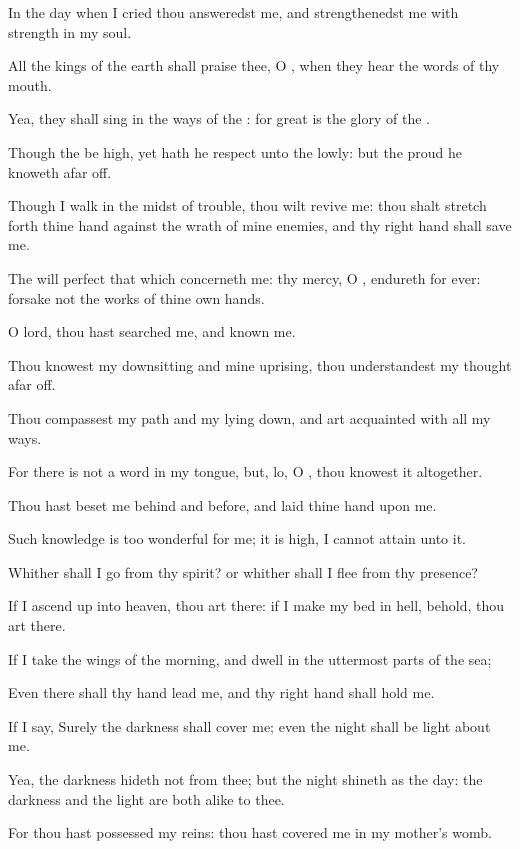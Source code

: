 \Verse In the day when I cried thou answeredst me, and strengthenedst me with strength in my soul.

\Verse All the kings of the earth shall praise thee, O \LORD, when they hear the words of thy mouth.

\Verse Yea, they shall sing in the ways of the \LORD: for great is the glory of the \LORD.

\Verse Though the \LORD be high, yet hath he respect unto the lowly: but the proud he knoweth afar off.

\Verse Though I walk in the midst of trouble, thou wilt revive me: thou shalt stretch forth thine hand against the wrath of mine enemies, and thy right hand shall save me.

\Verse The \LORD will perfect that which concerneth me: thy mercy, O \LORD, endureth for ever: forsake not the works of thine own hands.




\Chapter
\Verse O lord, thou hast searched me, and known me.

\Verse Thou knowest my downsitting and mine uprising, thou understandest my thought afar off.

\Verse Thou compassest my path and my lying down, and art acquainted with all my ways.

\Verse For there is not a word in my tongue, but, lo, O \LORD, thou knowest it altogether.

\Verse Thou hast beset me behind and before, and laid thine hand upon me.

\Verse Such knowledge is too wonderful for me; it is high, I cannot attain unto it.

\Verse Whither shall I go from thy spirit? or whither shall I flee from thy presence?

\Verse If I ascend up into heaven, thou art there: if I make my bed in hell, behold, thou art there.

\Verse If I take the wings of the morning, and dwell in the uttermost parts of the sea;

\Verse Even there shall thy hand lead me, and thy right hand shall hold me.

\Verse If I say, Surely the darkness shall cover me; even the night shall be light about me.

\Verse Yea, the darkness hideth not from thee; but the night shineth as the day: the darkness and the light are both alike to thee.

\Verse For thou hast possessed my reins: thou hast covered me in my mother's womb.

